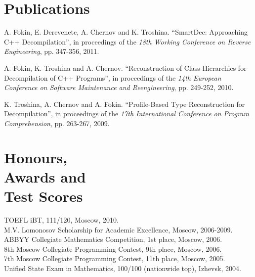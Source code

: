 \documentclass[margin,line]{CV}
\begin{document}
\begin{resume}


    \section{\mysidestyle Publications}
    A. Fokin, E. Derevenetc, A. Chernov and K. Troshina. ``SmartDec: Approaching C++ Decompilation'',
    in proceedings of the \textsl{18th Working Conference on Reverse Engineering}, pp. 347-356, 2011.

    A. Fokin, K. Troshina and A. Chernov. ``Reconstruction of Class Hierarchies for Decompilation of C++ Programs'',
    in proceedings of the \textsl{14th European Conference on Software Maintenance and Reengineering}, pp. 249-252, 2010.

    K. Troshina, A. Chernov and A. Fokin. ``Profile-Based Type Reconstruction for Decompilation'',
    in proceedings of the \textsl{17th International Conference on Program Comprehension}, pp. 263-267, 2009.

    \pagebreak    
    
    \section{\mysidestyle Honours, \\Awards and \\Test Scores}
    TOEFL iBT, 111/120, Moscow, 2010.                                                               \vspace{1mm}\\
    M.V. Lomonosov Scholarship for Academic Excellence, Moscow, 2006-2009.                          \vspace{1mm}\\
    ABBYY Collegiate Mathematics Competition, 1st place, Moscow, 2006.                              \vspace{1mm}\\
    8th Moscow Collegiate Programming Contest, 9th place, Moscow, 2006.                             \vspace{1mm}\\
    7th Moscow Collegiate Programming Contest, 11th place, Moscow, 2005.                            \vspace{1mm}\\
    Unified State Exam in Mathematics, 100/100 (nationwide top), Izhevsk, 2004.                     \vspace{1mm}


\end{resume}
\end{document}
